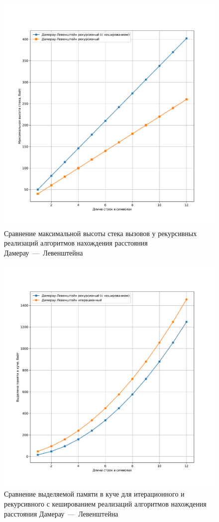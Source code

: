 \begin{figure}[H]
	\centering
	\includegraphics[width=\textwidth]{img/fn_max_stack.pdf}
	\caption{Сравнение максимальной высоты стека вызовов у рекурсивных реализаций алгоритмов нахождения расстояния Дамерау~---~Левенштейна}
	\label{fig:fn_max_stack}
\end{figure}

\begin{figure}[H]
	\centering
	\includegraphics[width=\textwidth]{img/fn_heap.pdf}
	\caption{Сравнение выделяемой памяти в куче для итерационного и рекурсивного с кешированием реализаций алгоритмов нахождения расстояния Дамерау~---~Левенштейна}
	\label{fig:fn_heap}
\end{figure}

